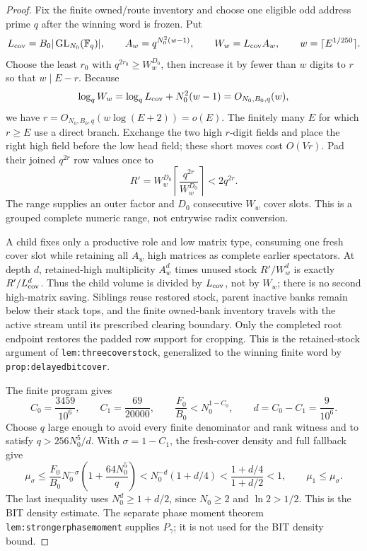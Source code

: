 \begin{proof}
Fix the finite owned/route inventory and choose one eligible odd address
prime $q$ after the winning word is frozen.  Put
\[
  L_{\rm cov}=B_0|\operatorname{GL}_{N_0}(\mathbb F_q)|,\qquad
  A_w=q^{N_0^2(w-1)},\qquad W_w=L_{\rm cov}A_w,
  \qquad w=\lceil E^{1/250}\rceil.
\]
Choose the least $r_0$ with $q^{2r_0}\geq W_w^{D_0}$, then increase it
by fewer than $w$ digits to $r$ so that $w\mid E-r$.  Because
\[
  \log_q W_w=\log_q L_{\rm cov}+N_0^2(w-1)=O_{N_0,B_0,q}(w),
\]
we have $r=O_{N_0,B_0,q}(w\log(E+2))=o(E)$.  The finitely many $E$
for which $r\geq E$ use a direct branch.  Exchange the two high
$r$-digit fields and place the right high field before the low head field;
these short moves cost $O(Vr)$.  Pad their joined $q^{2r}$ row values
once to
\[
  R'=W_w^{D_0}\left\lceil\frac{q^{2r}}{W_w^{D_0}}\right\rceil
       <2q^{2r}.
\]
The range supplies an outer factor and $D_0$ consecutive $W_w$ cover
slots.  This is a grouped complete numeric range, not entrywise radix
conversion.

A child fixes only a productive role and low matrix type, consuming one
fresh cover slot while retaining all $A_w$ high matrices as complete
earlier spectators.  At depth $d$, retained-high multiplicity $A_w^d$
times unused stock $R'/W_w^d$ is exactly $R'/L_{\rm cov}^d$.  Thus the
child volume is divided by $L_{\rm cov}$, not by $W_w$; there is no
second high-matrix saving.  Siblings reuse restored stock, parent
inactive banks remain below their stack tops, and the finite owned-bank
inventory travels with the active stream until its prescribed clearing
boundary.  Only the completed root endpoint restores the padded row
support for cropping.  This is the retained-stock argument of
\texttt{lem:threecoverstock}, generalized to the winning finite word by
\texttt{prop:delayedbitcover}.

The finite program gives
\[
  C_0=\frac{3459}{10^6},\qquad C_1=\frac{69}{20000},\qquad
  \frac{F_0}{B_0}<N_0^{1-C_0},\qquad d=C_0-C_1=\frac9{10^6}.
\]
Choose $q$ large enough to avoid every finite denominator and rank
witness and to satisfy $q>256N_0^5/d$.  With
$\sigma=1-C_1$, the fresh-cover density and full fallback give
\[
  \mu_\sigma\leq\frac{F_0}{B_0}N_0^{-\sigma}
       \left(1+\frac{64N_0^5}{q}\right)
   <N_0^{-d}(1+d/4)
   <\frac{1+d/4}{1+d/2}<1,
  \qquad \mu_1\leq\mu_\sigma.
\]
The last inequality uses $N_0^d\geq1+d/2$, since $N_0\geq2$ and
$\ln 2>1/2$.  This is the BIT density estimate.  The separate phase
moment theorem \texttt{lem:strongerphasemoment} supplies $P_\gamma$; it
is not used for the BIT density bound.


\end{proof}

